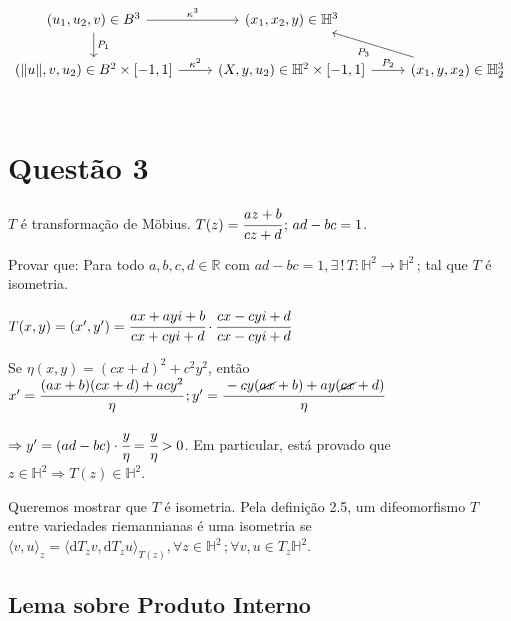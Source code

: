 \documentclass[10pt,a4paper]{article}
\begin{document}
		\[
		\begin{tikzcd}
		(u_1, u_2, v) \in B^3 \arrow{r}{\kappa^3} \arrow{d}{P_1}	& (x_1, x_2, y) \in \mathbb{H}^3  \\
		(\Vert u \Vert, v, u_2) \in B^2 \times [-1, 1] \arrow{r}{\kappa^2}                     			& (X, y, u_2) \in \mathbb{H}^2 \times [-1, 1] \arrow{r}{P_2} & (x_1, y, x_2) \in \mathbb{H}_2^3 \arrow{ul}{P_3}  \\
		\end{tikzcd}
		\]

\section{Quest\~ao 3}
		\begin{flushright}
		\end{flushright}

		$T$ \'e transforma\c{c}\~ao de M\"obius. $T(z) = \cfrac{az + b}{cz + d} \, ; \, ad - bc = 1$.

		\vspace{3mm}

		Provar que: Para todo $a, b, c, d \in \mathbb{R}$ com $ad - bc = 1, \exists \,!\, T : \mathbb{H}^2 \rightarrow \mathbb{H}^2$\,; tal que $T$ \'e isometria.

		\vspace{3mm}

		$T(x,y) = (x', y') = \cfrac{ax + ayi + b}{cx + cyi + d} \cdot \cfrac{cx - cyi + d}{cx - cyi + d}$

		Se $\eta(x,y) = (cx + d)^2 + c^2 y^2$, ent\~ao $x' = \cfrac{(ax + b)(cx + d) + acy^2}{\eta} \,; y' = \cfrac{-cy(\cancel{ax} + b) + ay(\cancel{cx} + d)}{\eta}$

		$\Rightarrow y' = (ad - bc) \cdot \cfrac{y}{\eta} = \cfrac{y}{\eta} > 0$. Em particular, est\'a provado que $z \in \mathbb{H}^2 \Rightarrow T(z) \in \mathbb{H}^2$.

		Queremos mostrar que $T$ \'e isometria. Pela defini\c{c}\~ao 2.5, um difeomorfismo $T$ entre variedades riemannianas \'e uma isometria se $\langle v, u \rangle_z = \langle \mathrm{d}T_z v, \mathrm{d}T_z u \rangle_{T(z)}, \forall z \in \mathbb{H}^2\,; \forall v, u \in T_z\mathbb{H}^2$.

		\subsection{Lema sobre Produto Interno}
		\begin{flushright}
		\end{flushright}
\end{document}
